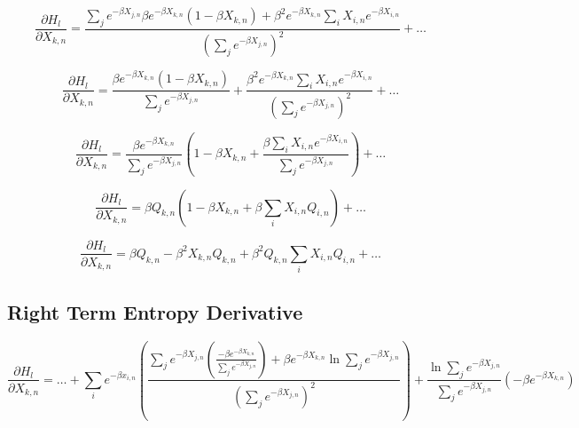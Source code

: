 \begin{displaymath}
    \frac{\partial H_{l}}{\partial X_{k,n}} =
    \frac{\sum_{j}e^{-\beta X_{j,n}} \beta e^{-\beta X_{k,n}}\left(1 - \beta X_{k,n}\right) + \beta^{2} e^{-\beta X_{k,n}} \sum_{i}X_{i,n}e^{-\beta X_{i,n}}}{\left(\sum_{j}e^{-\beta X_{j,n}}\right)^{2}}
    + \ldots
\end{displaymath}

\begin{displaymath}
    \frac{\partial H_{l}}{\partial X_{k,n}} =
    \frac{\beta e^{-\beta X_{k,n}}\left(1 - \beta X_{k,n}\right)}{\sum_{j}e^{-\beta X_{j,n}}}
    + \frac{\beta^{2} e^{-\beta X_{k,n}} \sum_{i}X_{i,n}e^{-\beta X_{i,n}}}{\left(\sum_{j}e^{-\beta X_{j,n}}\right)^{2}}
    + \ldots
\end{displaymath}

\begin{displaymath}
    \frac{\partial H_{l}}{\partial X_{k,n}} =
    \frac{\beta e^{-\beta X_{k,n}}}{\sum_{j}e^{-\beta X_{j,n}}} \left(1 - \beta X_{k,n} + \frac{\beta \sum_{i}X_{i,n}e^{-\beta X_{i,n}}}{\sum_{j}e^{-\beta X_{j,n}}}\right)
    + \ldots
\end{displaymath}

\begin{displaymath}
    \frac{\partial H_{l}}{\partial X_{k,n}} = \beta Q_{k,n} \left(1 - \beta X_{k,n} + \beta \sum_{i}X_{i,n}Q_{i,n}\right) + \ldots
\end{displaymath}

\begin{displaymath}
    \frac{\partial H_{l}}{\partial X_{k,n}} = \beta Q_{k,n} - \beta^{2}X_{k,n}Q_{k,n} + \beta^{2}Q_{k,n}\sum_{i}X_{i,n}Q_{i,n} + \ldots
\end{displaymath}

\subsection{Right Term Entropy Derivative}

\begin{displaymath}
    \frac{\partial H_{l}}{\partial X_{k,n}} = \ldots + 
    \sum_{i}e^{-\beta x_{i,n}} \left(\frac{\sum_{j}e^{-\beta X_{j,n}} \left(\frac{-\beta e^{-\beta X_{k,n}}}{\sum_{j}e^{-\beta X_{j,n}}}\right)
    + \beta e^{-\beta X_{k,n}}\ln{\sum_{j}e^{-\beta X_{j,n}}}}{\left(\sum_{j}e^{-\beta X_{j,n}}\right)^{2}}\right)
    + \frac{\ln{\sum_{j}e^{-\beta X_{j,n}}}}{\sum_{j}e^{-\beta X_{j,n}}}\left(-\beta e^{-\beta X_{k,n}}\right)
\end{displaymath}

